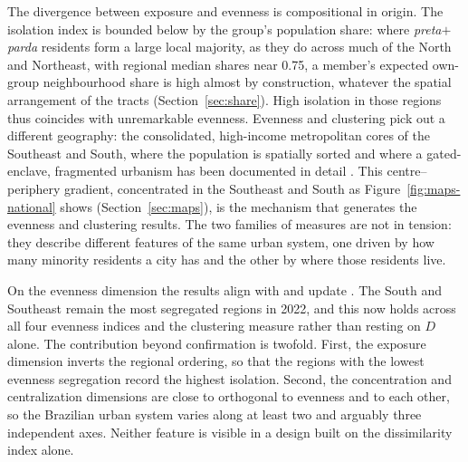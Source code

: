 \documentclass[12pt,a4paper]{article}
\begin{document}
The divergence between exposure and evenness is compositional in origin. The isolation index is bounded below by the group's population share: where \emph{preta}$+$\emph{parda} residents form a large local majority, as they do across much of the North and Northeast, with regional median shares near 0.75, a member's expected own-group neighbourhood share is high almost by construction, whatever the spatial arrangement of the tracts (Section~\ref{sec:share}). High isolation in those regions thus coincides with unremarkable evenness. Evenness and clustering pick out a different geography: the consolidated, high-income metropolitan cores of the Southeast and South, where the population is spatially sorted and where a gated-enclave, fragmented urbanism has been documented in detail \citep{barros2024saopaulolondres, danilofranca2022fortaleza, telles2004race}. This centre--periphery gradient, concentrated in the Southeast and South as Figure~\ref{fig:maps-national} shows (Section~\ref{sec:maps}), is the mechanism that generates the evenness and clustering results. The two families of measures are not in tension: they describe different features of the same urban system, one driven by how many minority residents a city has and the other by where those residents live.

On the evenness dimension the results align with and update \citet{deSouza2023nationwide_english}. The South and Southeast remain the most segregated regions in 2022, and this now holds across all four evenness indices and the clustering measure rather than resting on $D$ alone. The contribution beyond confirmation is twofold. First, the exposure dimension inverts the regional ordering, so that the regions with the lowest evenness segregation record the highest isolation. Second, the concentration and centralization dimensions are close to orthogonal to evenness and to each other, so the Brazilian urban system varies along at least two and arguably three independent axes. Neither feature is visible in a design built on the dissimilarity index alone.
\end{document}
